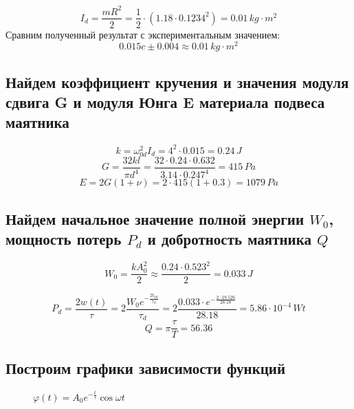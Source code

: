 \documentclass[a4paper,12pt]{report}
\begin{document}
\[ I_d = \frac{mR^2}{2} = \frac{1}{2}\cdot (1.18 \cdot 0.1234^2) = 0.01 \, kg \cdot m^2\]
Сравним полученный результат с экспериментальным значением:
\[ 0.015c\pm 0.004 \approx 0.01 \, kg\cdot m^2\]

\subsection*{Найдем коэффициент кручения и значения модуля сдвига G и модуля Юнга E материала подвеса маятника}

\[ k = \omega_{0d}^2I_d  = 4^2 \cdot 0.015 = 0.24 \, J\]
\[ G = \frac{32kl}{\pi d^4} = \frac{32 \cdot 0.24 \cdot 0.632}{3.14 \cdot 0.247^4} = 415 \, Pa \]
\[ E = 2G(1 + \nu) = 2\cdot 415 (1+0.3) = 1079 \, Pa \]

\subsection*{Найдем начальное значение полной энергии $W_0$, мощность потерь $P_d$ и добротность маятника $Q$}

\[ W_0 = \frac{kA_0^2}{2} \approx \frac{0.24\cdot 0.523^2}{2}  = 0.033\, J\]

\[ P_d = \frac{2w(t)}{\tau} = 2 \frac{W_0e^{-\frac{2t_{0d}}{\tau_d}}}{\tau_d} = 2\frac{0.033\cdot e^{-\frac{2\cdot 19.526}{28.18}}}{28.18} = 5.86\cdot 10^{-4} \, Wt\]
\[ Q = \pi \frac{\tau}{T} = 56.36 \]


\newpage
\subsection*{Построим графики зависимости функций}


\begin{figure}[h]%
	\centering
	\caption{$\varphi(t) = A_0e^{-\frac{t}{\tau}}\cos \omega t$}
	\label{framework1} %
\end{figure}
\end{document}
